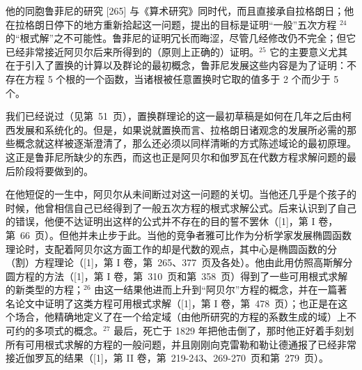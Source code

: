 他的同胞鲁菲尼的研究 {[}265{]} 与《算术研究》同时代，而且直接承自拉格朗日；他在拉格朗日停下的地方重新拾起这一问题，提出的目标是证明“一般”五次方程 \(^{24}\) 的“根式解”之不可能性。鲁菲尼的证明冗长而晦涩，尽管几经修改仍不完全；但它已经非常接近阿贝尔后来所得到的（原则上正确的）证明。\(^{25}\) 它的主要意义尤其在于引入了置换的计算以及群论的最初概念，鲁菲尼发展这些内容是为了证明：不存在方程 5 个根的一个函数，当诸根被任意置换时它取的值多于 2 个而少于 5 个。

我们已经说过（见第~51~页），置换群理论的这一最初草稿是如何在几年之后由柯西发展和系统化的。但是，如果说就置换而言、拉格朗日诸观念的发展所必需的那些概念就这样被逐渐澄清了，那么还必须以同样清晰的方式陈述域论的最初原理。这正是鲁菲尼所缺少的东西，而这也正是阿贝尔和伽罗瓦在代数方程求解问题的最后阶段将要做到的。

在他短促的一生中，阿贝尔从未间断过对这一问题的关切。当他还几乎是个孩子的时候，他曾相信自己已经得到了一般五次方程的根式求解公式。后来认识到了自己的错误，他便不达证明出这样的公式并不存在的目的誓不罢休（{[}1{]}，第 I 卷，第~66~页）。但他并未止步于此。当他的竞争者雅可比作为分析学家发展椭圆函数理论时，支配着阿贝尔这方面工作的却是代数的观点，其中心是椭圆函数的分（割）方程理论（{[}1{]}，第 I 卷，第~265、377~页及各处）。他由此用仿照高斯解分圆方程的方法（{[}1{]}，第 I 卷，第~310~页和第~358~页）得到了一些可用根式求解的新类型的方程；\(^{26}\) 由这一结果他进而上升到“阿贝尔”方程的概念，并在一篇著名论文中证明了这类方程可用根式求解（{[}1{]}，第 I 卷，第~478~页）；也正是在这个场合，他精确地定义了在一个给定域（由他所研究的方程的系数生成的域）上不可约的多项式的概念。\(^{27}\) 最后，死亡于 1829 年把他击倒了，那时他正好着手刻划所有可用根式求解的方程的一般问题，并且刚刚向克雷勒和勒让德通报了已经非常接近伽罗瓦的结果（{[}1{]}，第 II 卷，第~219-243、269-270~页和第~279~页）。

